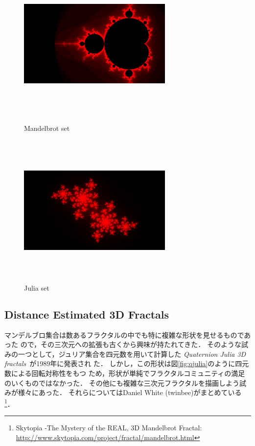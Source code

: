 \begin{figure}[htbp]
 \begin{minipage}{0.49\hsize}
  \center
   \includegraphics[width=3in, height=3in, keepaspectratio]{../img/fractal/mandelbrot.pdf}
   \caption{Mandelbrot set}
   \label{fig:mandelbrot}
 \end{minipage}
 \begin{minipage}{0.49\hsize}
  \center
  \includegraphics[width=3in, height=3in, keepaspectratio]{../img/fractal/julia.pdf}
  \caption{Julia set}
  \label{fig:julia}
 \end{minipage}
\end{figure}

\subsection{Distance Estimated 3D Fractals}

マンデルブロ集合は数あるフラクタルの中でも特に複雑な形状を見せるものであった
ので，その三次元への拡張も古くから興味が持たれてきた．
そのような試みの一つとして，ジュリア集合を四元数を用いて計算した
\textit{Quaternion Julia 3D fractals}~\cite{hart1989ray}が1989年に発表され
た．
しかし，この形状は図\ref{fig:qjulia}のように四元数による回転対称性をもつ
ため，形状が単純でフラクタルコミュニティの満足のいくものではなかった．
その他にも複雑な三次元フラクタルを描画しよう試みが様々にあった．
それらについてはDaniel White (twinbee)がまとめている
\footnote{Skytopia -The Mystery of the REAL, 3D Mandelbrot Fractal:~
\url{http://www.skytopia.com/project/fractal/mandelbrot.html}}．

